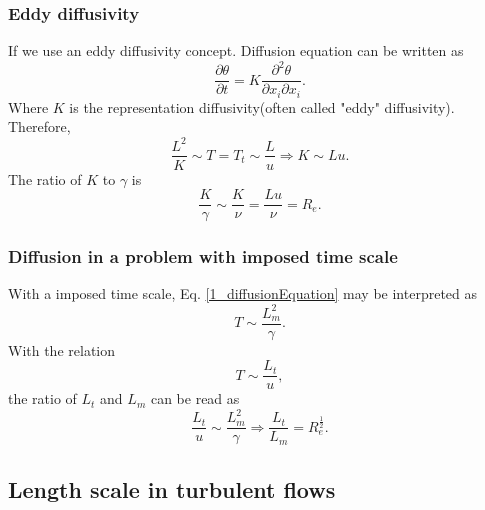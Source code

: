 \documentclass[review]{elsarticle}
\begin{document}
		\subsubsection 	{Eddy diffusivity}
			If we use an eddy diffusivity concept. Diffusion equation can be written as
			\begin{equation}
				\frac{\partial \theta}{\partial {t}}=K \frac{\partial ^2\theta}{\partial x_i\partial x_i}.
			\end{equation} 
			Where $K$ is the representation diffusivity(often called "eddy" diffusivity). Therefore, 
			\begin{equation}
				\frac{L^2}{K} \sim T = T_t \sim \frac{L}{u} \Rightarrow K \sim Lu.
			\end{equation}
			The ratio of $K$ to $\gamma$ is
			\begin{equation}
				\frac{K}{\gamma} \sim \frac{K}{\nu}=\frac{Lu}{\nu}=R_e.
			\end{equation}
			\begin{center}
			\end{center}			
		\subsubsection{Diffusion in a problem with imposed time scale}
			With a imposed time scale, Eq. \ref{1_diffusionEquation} may be interpreted as
			\begin{equation} 
				T \sim \frac{L_m^2}{\gamma}.
			\end{equation}
			With the relation
			\begin{equation}
				T \sim \frac{L_t}{u},
			\end{equation}
			the ratio of $L_t$ and $L_m$ can be read as
			\begin{equation}
				\frac{L_t}{u} \sim \frac{L_m^2}{\gamma} \Rightarrow \frac{L_t}{L_m} = R_e^{\frac{1}{2}}.
			\end{equation}
	\subsection {Length scale in turbulent flows}
\end{document}
